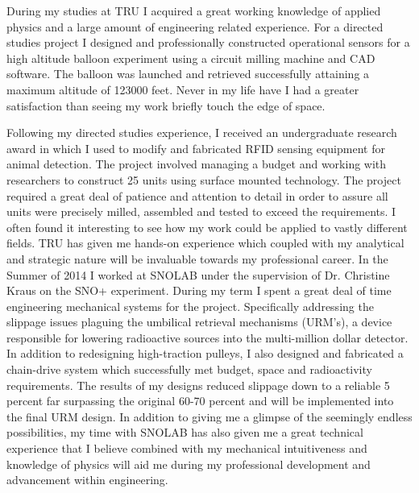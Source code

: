 \documentclass[11pt,a4paper,sans]{moderncv} %
\begin{document}
  During my studies at TRU I acquired a great working knowledge of applied physics and a large amount of engineering related experience. For a directed studies project I designed and professionally constructed operational sensors for a high altitude balloon experiment using a circuit milling machine and CAD software. The balloon was launched and retrieved successfully attaining a maximum altitude of 123000 feet. Never in my life have I had a greater satisfaction than seeing my work briefly touch the edge of space. 

 Following my directed studies experience, I received an undergraduate research award in which I used to modify and fabricated RFID sensing equipment for animal detection. The project involved managing a budget and working with researchers to construct 25 units using surface mounted technology. The project required a great deal of patience and attention to detail in order to assure all units were precisely milled, assembled and tested to exceed the requirements. I often found it interesting to see how my work could be applied to vastly different fields. TRU has given me hands-on experience which coupled with my analytical and strategic nature will be invaluable towards my professional career.
\newline
\newline
\newline
\newline
  In the Summer of 2014 I worked at SNOLAB under the supervision of Dr. Christine Kraus on the
SNO+ experiment. During my term I spent a great deal of time engineering mechanical systems for the project. Specifically addressing the slippage issues plaguing the umbilical retrieval mechanisms (URM's), a device responsible for lowering radioactive sources into the multi-million dollar detector. In addition to redesigning high-traction pulleys, I also designed and fabricated a chain-drive system which successfully met budget, space and radioactivity requirements. The results of my designs reduced slippage down to a reliable 5 percent far surpassing the original 60-70 percent and will be implemented into the final URM design. In addition to giving me a glimpse of the seemingly endless possibilities, my time with SNOLAB has also given me a great technical experience that I believe combined with my mechanical intuitiveness and knowledge of physics will aid me during my professional development and advancement within engineering.
\end{document}
